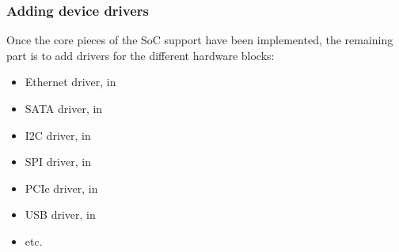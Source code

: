 \begin{frame}
  \frametitle{Adding device drivers}
  Once the core pieces of the SoC support have been implemented, the
  remaining part is to add drivers for the different hardware blocks:
  \begin{itemize}
  \item Ethernet driver, in 
  \item SATA driver, in 
  \item I2C driver, in 
  \item SPI driver, in 
  \item PCIe driver, in 
  \item USB driver, in 
  \item etc.
  \end{itemize}
\end{frame}

